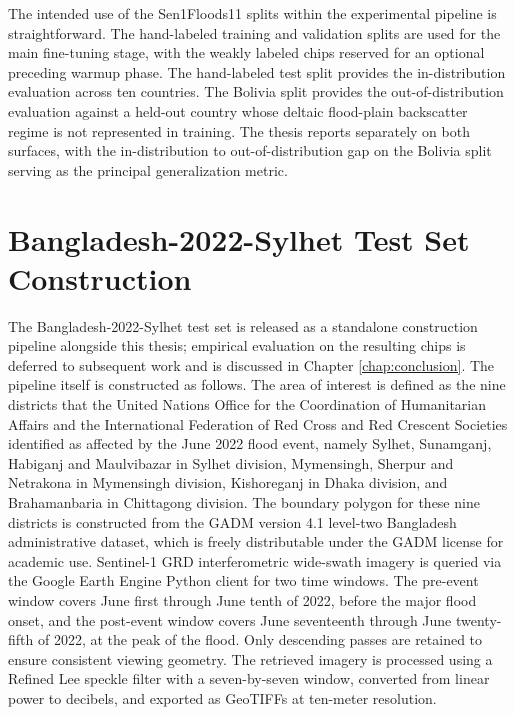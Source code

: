 \documentclass[11pt,a4paper,oneside]{report}
\begin{document}
The intended use of the Sen1Floods11 splits within the experimental pipeline is straightforward. The hand-labeled training and validation splits are used for the main fine-tuning stage, with the weakly labeled chips reserved for an optional preceding warmup phase. The hand-labeled test split provides the in-distribution evaluation across ten countries. The Bolivia split provides the out-of-distribution evaluation against a held-out country whose deltaic flood-plain backscatter regime is not represented in training. The thesis reports separately on both surfaces, with the in-distribution to out-of-distribution gap on the Bolivia split serving as the principal generalization metric.

\section{Bangladesh-2022-Sylhet Test Set Construction}
\label{sec:bangladesh-pipeline}

The Bangladesh-2022-Sylhet test set is released as a standalone construction pipeline alongside this thesis; empirical evaluation on the resulting chips is deferred to subsequent work and is discussed in Chapter \ref{chap:conclusion}. The pipeline itself is constructed as follows. The area of interest is defined as the nine districts that the United Nations Office for the Coordination of Humanitarian Affairs and the International Federation of Red Cross and Red Crescent Societies identified as affected by the June 2022 flood event, namely Sylhet, Sunamganj, Habiganj and Maulvibazar in Sylhet division, Mymensingh, Sherpur and Netrakona in Mymensingh division, Kishoreganj in Dhaka division, and Brahamanbaria in Chittagong division. The boundary polygon for these nine districts is constructed from the GADM version 4.1 level-two Bangladesh administrative dataset, which is freely distributable under the GADM license for academic use. Sentinel-1 GRD interferometric wide-swath imagery is queried via the Google Earth Engine Python client for two time windows. The pre-event window covers June first through June tenth of 2022, before the major flood onset, and the post-event window covers June seventeenth through June twenty-fifth of 2022, at the peak of the flood. Only descending passes are retained to ensure consistent viewing geometry. The retrieved imagery is processed using a Refined Lee speckle filter with a seven-by-seven window, converted from linear power to decibels, and exported as GeoTIFFs at ten-meter resolution.
\end{document}
